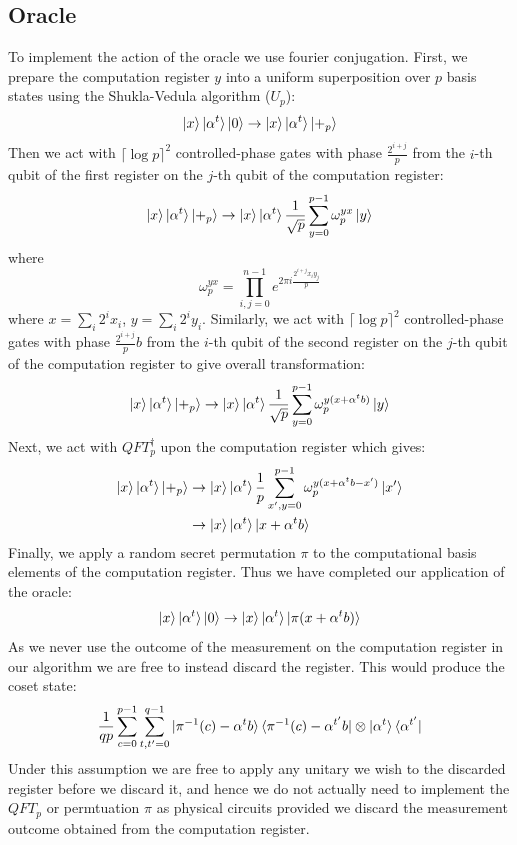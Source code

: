 \subsection{Oracle}
To implement the action of the oracle we use fourier conjugation. First, we prepare the computation register $y$ into a uniform superposition over $p$ basis states using the Shukla-Vedula algorithm ($U_p$):
\begin{equation}
   \ket{x}\ket{\alpha^t}\ket{0}\rightarrow\ket{x}\ket{\alpha^t}\ket{+_p}
\end{equation}
Then we act with $\lceil\log p\rceil^2$ controlled-phase gates with phase $\frac{2^{i+j}}{p}$ from the $i$-th qubit of the first register on the $j$-th qubit of the computation register:
\begin{equation}
    \ket{x}\ket{\alpha^t}\ket{+_p} \rightarrow \ket{x}\ket{\alpha^t}\frac{1}{\sqrt{p}}\sum_{y=0}^{p-1}\omega_p^{yx}\ket{y}
\end{equation}
where
\begin{equation}
    \omega_p^{yx} =  \prod_{i,j=0}^{n-1} e^{2\pi i \frac{2^{i+j}x_iy_j}{p}}
\end{equation}
where $x = \sum_i 2^i x_i$, $y = \sum_i 2^i y_i$. Similarly, we act with $\lceil\log p\rceil^2$ controlled-phase gates with phase $\frac{2^{i+j}}{p}b$ from the $i$-th qubit of the second register on the $j$-th qubit of the computation register to give overall transformation:
\begin{equation}
   \ket{x}\ket{\alpha^t}\ket{+_p}\rightarrow \ket{x}\ket{\alpha^t}\frac{1}{\sqrt{p}}\sum_{y=0}^{p-1}\omega_p^{y(x+\alpha^tb)}\ket{y}
\end{equation}
Next, we act with $QFT^{\dagger}_p$ upon the computation register which gives:
\begin{align}
    \ket{x}\ket{\alpha^t}\ket{+_p} &\rightarrow \ket{x}\ket{\alpha^t}\frac{1}{p}\sum_{x',y=0}^{p-1}\omega_p^{y(x+\alpha^t b-x')}\ket{x'}\\
    &\rightarrow \ket{x}\ket{\alpha^t}\ket{x+\alpha^tb}
\end{align}
Finally, we apply a random secret permutation $\pi$ to the computational basis elements of the computation register. Thus we have completed our application of the oracle:
\begin{equation}
   \ket{x}\ket{\alpha^t}\ket{0} \rightarrow \ket{x}\ket{\alpha^t}\ket{\pi(x+\alpha^tb)}
\end{equation}
As we never use the outcome of the measurement on the computation register in our algorithm we are free to instead discard the register. This would produce the coset state:
\begin{equation}
    \frac{1}{qp}\sum_{c=0}^{p-1}\sum_{t,t'=0}^{q-1} \ket{\pi^{-1}(c) - \alpha^tb}\bra{\pi^{-1}(c) - \alpha^{t'}b} \otimes \ket{\alpha^t}\bra{\alpha^{t'}}
\end{equation}
Under this assumption we are free to apply any unitary we wish to the discarded register before we discard it, and hence we do not actually need to implement the $QFT_p$ or permtuation $\pi$ as physical circuits provided we discard the measurement outcome obtained from the computation register.

